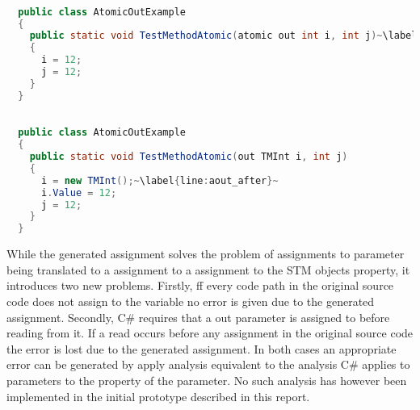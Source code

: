 \begin{lstlisting}[label=lst:before_atomic_out_parameter,
  caption={\bscode{atomic out} Parameter Before Transformation},
  language=Java,  
  showspaces=false,
  showtabs=false,
  breaklines=true,
  showstringspaces=false,
  breakatwhitespace=true,
  escapechar=~,
  commentstyle=\color{greencomments},
  keywordstyle=\color{bluekeywords},
  stringstyle=\color{redstrings},
  morekeywords={atomic, retry, orelse, var, get, set, ret, out}]  % Start your code-block

  public class AtomicOutExample
  {
    public static void TestMethodAtomic(atomic out int i, int j)~\label{line:aout_before}~
    {
      i = 12;
      j = 12;
    }
  }
\end{lstlisting}

\begin{lstlisting}[label=lst:after_atomic_out_parameter,
  caption={\bscode{atomic out} Parameter After Transformation},
  language=Java,  
  showspaces=false,
  showtabs=false,
  breaklines=true,
  showstringspaces=false,
  breakatwhitespace=true,
  escapechar=~,
  commentstyle=\color{greencomments},
  keywordstyle=\color{bluekeywords},
  stringstyle=\color{redstrings},
  morekeywords={atomic, retry, orelse, var, get, set, ret, out}]  % Start your code-block

  public class AtomicOutExample
  {
    public static void TestMethodAtomic(out TMInt i, int j)
    {
      i = new TMInt();~\label{line:aout_after}~
      i.Value = 12;
      j = 12;
    }
  }
\end{lstlisting}

While the generated assignment solves the problem of assignments to  parameter being translated to a assignment to a assignment to the \ac{STM} objects  property, it introduces two new problems. Firstly, ff every code path in the original source code does not assign to the variable no error is given due to the generated assignment. Secondly, C\# requires that a out parameter is assigned to before reading from it. If a read occurs before any assignment in the original source code the error is lost due to the generated assignment. In both cases an appropriate error can be generated by apply analysis equivalent to the analysis C\# applies to  parameters to the  property of the  parameter. No such analysis has however been implemented in the initial prototype described in this report.


